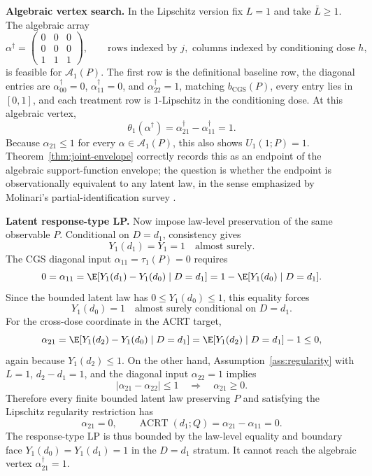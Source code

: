 \textbf{Algebraic vertex search.} In the Lipschitz version fix \(L=1\) and take
\(\bar L\ge 1\).  The algebraic array
\[
  \alpha^\dagger=
  \begin{pmatrix}
    0&0&0\\
    0&0&0\\
    1&1&1
  \end{pmatrix},
  \qquad
  \text{rows indexed by }j,\text{ columns indexed by conditioning dose }h,
\]
is feasible for \(\mathcal A_1(P)\).  The first row is the definitional
baseline row, the diagonal entries are
\(\alpha^\dagger_{00}=0\), \(\alpha^\dagger_{11}=0\), and
\(\alpha^\dagger_{22}=1\), matching \(b_{\mathrm{CGS}}(P)\), every entry lies
in \([0,1]\), and each treatment row is \(1\)-Lipschitz in the conditioning
dose.  At this algebraic vertex,
\[
  \theta_1(\alpha^\dagger)
  =\alpha^\dagger_{21}-\alpha^\dagger_{11}=1.
\]
Because \(\alpha_{21}\le 1\) for every \(\alpha\in\mathcal A_1(P)\), this also
shows \(U_1(1;P)=1\).  Theorem~\ref{thm:joint-envelope} correctly records this
as an endpoint of the algebraic support-function envelope; the question is
whether the endpoint is observationally equivalent to any latent law, in the
sense emphasized by Molinari's partial-identification survey
\cite{Molinari2020}.

\textbf{Latent response-type LP.} Now impose law-level preservation of the
same observable \(P\).  Conditional on \(D=d_1\), consistency gives
\[
  Y_1(d_1)=Y_1=1 \quad\text{almost surely}.
\]
The CGS diagonal input \(\alpha_{11}=\tau_1(P)=0\) requires
\[
  0=\alpha_{11}
  =\E[Y_1(d_1)-Y_1(d_0)\mid D=d_1]
  =1-\E[Y_1(d_0)\mid D=d_1].
\]
Since the bounded latent law has \(0\le Y_1(d_0)\le 1\), this equality forces
\[
  Y_1(d_0)=1 \quad\text{almost surely conditional on }D=d_1.
\]
For the cross-dose coordinate in the ACRT target,
\[
  \alpha_{21}
  =\E[Y_1(d_2)-Y_1(d_0)\mid D=d_1]
  =\E[Y_1(d_2)\mid D=d_1]-1
  \le 0,
\]
again because \(Y_1(d_2)\le 1\).  On the other hand, Assumption~\ref{ass:regularity}
with \(L=1\), \(d_2-d_1=1\), and the diagonal input \(\alpha_{22}=1\) implies
\[
  |\alpha_{21}-\alpha_{22}|\le 1
  \quad\Longrightarrow\quad
  \alpha_{21}\ge 0.
\]
Therefore every finite bounded latent law preserving \(P\) and satisfying the
Lipschitz regularity restriction has
\[
  \alpha_{21}=0,
  \qquad
  \operatorname{ACRT}(d_1;Q)=\alpha_{21}-\alpha_{11}=0.
\]
The response-type LP is thus bounded by the law-level equality and boundary
face \(Y_1(d_0)=Y_1(d_1)=1\) in the \(D=d_1\) stratum.  It cannot reach the
algebraic vertex \(\alpha^\dagger_{21}=1\).

